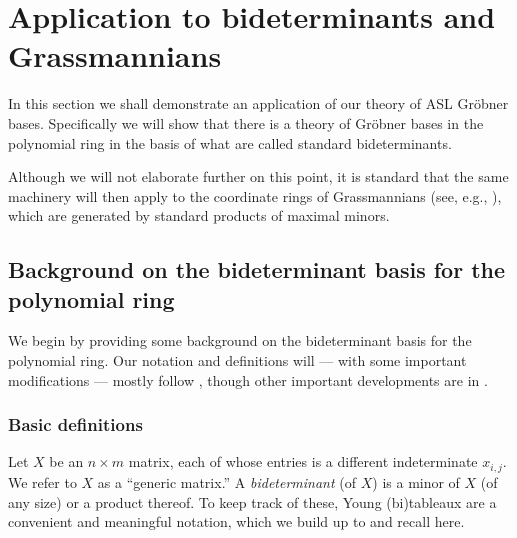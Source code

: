 \documentclass[11pt,reqno]{amsart}
\newcommand{\gb}{Gr\"{o}bner }
\theoremstyle{definition}
\numberwithin{equation}{section}
\begin{document}

\section{Application to bideterminants and Grassmannians}
\label{sec:bideterminants}

In this section we shall demonstrate an application of our theory of ASL \gb bases. Specifically we will show that there is a theory of \gb bases in the polynomial ring in the basis of what are called standard bideterminants. 

\begin{remark}
Although we will not elaborate further on this point, it is standard that the same machinery will then apply to the coordinate rings of Grassmannians (see, e.g., \cite{DEPYoung, sturmfels}), which are generated by standard products of maximal minors.
\end{remark}

\subsection{Background on the bideterminant basis for the polynomial ring}
\label{sec:bidet-background}

We begin by providing some background on the bideterminant basis for the polynomial ring. Our notation and definitions will --- with some important modifications --- mostly follow \cite{doubilet1974foundations, desarmenien1982invariant, grinberginvariant}, though other important developments are in \cite{DEPYoung, brunsconcagrobner, brunsconcakrs}.

\subsubsection{Basic definitions}
\label{subsec:basic-bidet-definitions-poly-ring}

Let $X$ be an $n \times m$ matrix, each of whose entries is a different indeterminate $x_{i,j}$. We refer to $X$ as a ``generic matrix.'' A \emph{bideterminant} (of $X$) is a minor of $X$ (of any size) or a product thereof. To keep track of these, Young (bi)tableaux are a convenient and meaningful notation, which we build up to and recall here.
\end{document}

